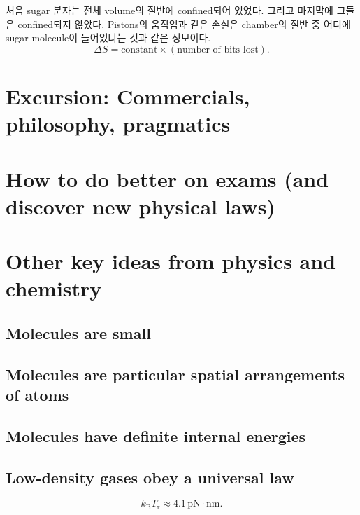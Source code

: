 처음 sugar 분자는 전체 volume의 절반에 confined되어 있었다. 그리고 마지막에 그들은 confined되지 않았다. Pistons의 움직임과 같은 손실은 chamber의 절반 중 어디에 sugar molecule이 들어있냐는 것과 같은 정보이다.
\begin{equation}
	\Delta S = \text{constant} \times (\text{number of bits lost}).
\end{equation}

\section{Excursion: Commercials, philosophy, pragmatics}

\section{How to do better on exams (and discover new physical laws)}

\section{Other key ideas from physics and chemistry}
\subsection{Molecules are small}

\subsection{Molecules are particular spatial arrangements of atoms}

\subsection{Molecules have definite internal energies}

\subsection{Low-density gases obey a universal law}

\begin{equation}
	k_\mathrm{B} T_\mathrm{r} \approx 4.1\, \mathrm{pN}\cdot \mathrm{nm}.
\end{equation}




